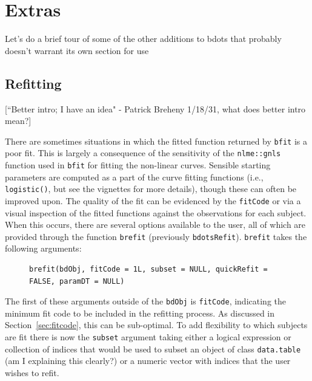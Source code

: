 \documentclass{article}
\newcommand{\xt}{\texttt}%
\begin{document}
\section{Extras}

Let's do a brief tour of some of the other additions to bdots that probably doesn't warrant its own section for use




\subsection{Refitting}

[``Better intro; I have an idea" - Patrick Breheny 1/18/31, what does better intro mean?]

There are sometimes situations in which the fitted function returned by \texttt{bfit} is a poor fit. This is largely a consequence of the sensitivity of the \xt{nlme::gnls} function used in \xt{bfit} for fitting the non-linear curves. Sensible starting parameters are computed as a part of the curve fitting functions (i.e., \xt{logistic()}, but see the vignettes for more details), though these can often be improved upon. The quality of the fit can be evidenced by the \texttt{fitCode} or via a visual inspection of the fitted functions against the observations for each subject.  When this occurs, there are several options available to the user, all of which are provided through the function \texttt{brefit} (previously \texttt{bdotsRefit}). \texttt{brefit} takes the following arguments:

\begin{singlespace}
\begin{figure}[H]
\centering
\begin{BVerbatim}
brefit(bdObj, fitCode = 1L, subset = NULL, quickRefit = FALSE, paramDT = NULL)
\end{BVerbatim}
\end{figure}
\end{singlespace}

The first of these arguments outside of the \xt{bdObj} is \xt{fitCode}, indicating the minimum fit code to be included in the refitting process. As discussed in Section~\ref{sec:fitcode}, this can be sub-optimal. To add flexibility to which subjects are fit there is now the \xt{subset} argument taking either a logical expression or collection of indices that would be used to subset an object of class \xt{data.table} (am I explaining this clearly?) or a numeric vector with indices that the user wishes to refit.
\end{document}
